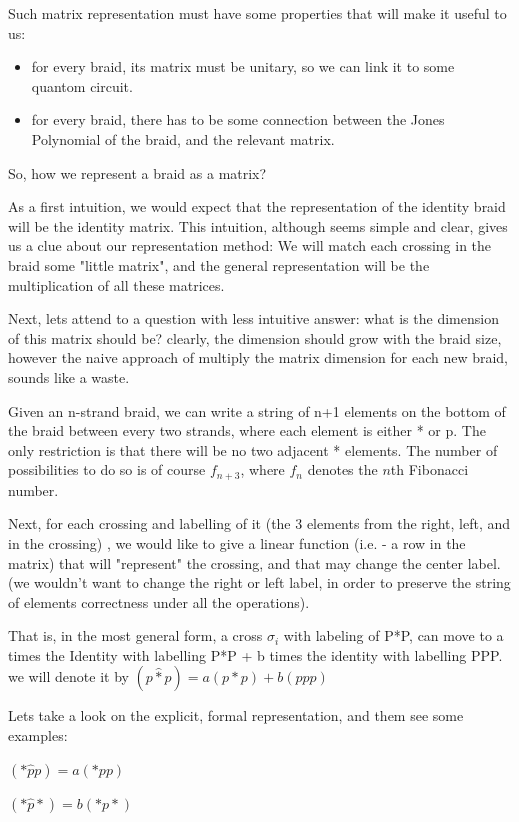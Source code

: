 \documentclass{article}
\begin{document}
\begin{theorem}
Such matrix representation must have some properties that will make it useful to us:
\begin{itemize}
\item for every braid, its matrix must be unitary, so we can link it to some quantom circuit.
\item for every braid, there has to be some connection between the Jones Polynomial of the braid, and the relevant matrix.
\end{itemize}

 So, how we represent a braid as a matrix?
 
As a first intuition, we would expect that the representation of the identity braid will be the identity matrix. This intuition, although seems simple and clear, gives us a clue about our representation method: We will match each crossing in the braid some "little matrix", and the general representation will be the multiplication of all these matrices.

Next, lets attend to a question with less intuitive answer: what is the dimension of this matrix should be? clearly, the dimension should grow with the braid size, however the naive approach of multiply the matrix dimension for each new braid, sounds like a waste.

 Given an n-strand braid, we can write a string of n+1 elements on the bottom of the braid between every two strands, where each element is either * or p. The only restriction is that there will be no two adjacent * elements. The number of possibilities to do so is of course $f_{n+3}$, where $f_{n}$ denotes the $n$th Fibonacci number.

Next, for each crossing and labelling of it (the 3 elements from the right, left, and in the crossing) , we would like to give a linear function (i.e. - a row in the matrix) that will "represent" the crossing, and that may change the center label. (we wouldn't want to change the right or left label, in order to preserve the string of elements correctness under all the operations).

That is, in the most general form, a cross $\sigma_{i}$ with labeling of P*P, can move to 
a times the Identity with labelling P*P + b times the identity with labelling PPP.
we will denote it by $(p\hat{*}p)=a(p*p)+b(ppp)$

Lets take a look on the explicit, formal representation, and them see some examples:

$(*\hat{p}p)=a(*pp)$

$(*\hat{p}*)=b(*p*)$


\end{theorem}
\end{document}
